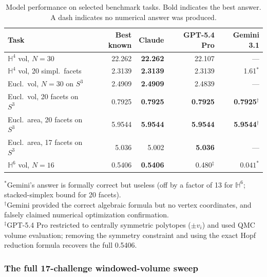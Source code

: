 \documentclass[11pt]{article}
\begin{document}
\begin{table}[ht]
\centering
\caption{Model performance on selected benchmark tasks.
Bold indicates the best answer. A dash indicates no numerical answer was produced.}
\label{tab:model-comparison}
\smallskip
\begin{tabular}{l r r r r}
\toprule
Task & Best known & Claude & GPT-5.4 Pro & Gemini 3.1 \\
\midrule
$\mathbb{H}^4$ vol, $N=30$ & 22.262 & \textbf{22.262} & 22.107 & --- \\
$\mathbb{H}^4$ vol, 20 simpl.\ facets & 2.3139 & \textbf{2.3139} & 2.3139 & 1.61$^*$ \\
Eucl.\ vol, $N=30$ on $S^3$ & 2.4909 & \textbf{2.4909} & 2.4839 & --- \\
Eucl.\ vol, 20 facets on $S^3$ & 0.7925 & \textbf{0.7925} & \textbf{0.7925} & \textbf{0.7925}$^\dagger$ \\
Eucl.\ area, 20 facets on $S^3$ & 5.9544 & \textbf{5.9544} & \textbf{5.9544} & \textbf{5.9544}$^\dagger$ \\
Eucl.\ area, 17 facets on $S^3$ & 5.036 & 5.002 & \textbf{5.036} & --- \\
$\mathbb{H}^6$ vol, $N=16$ & 0.5406 & \textbf{0.5406} & 0.480$^\ddagger$ & $0.041^{*}$ \\
\bottomrule
\end{tabular}
\smallskip

{\footnotesize $^*$Gemini's answer is formally correct but useless
(off by a factor of 13 for $\mathbb{H}^6$; stacked-simplex bound for 20 facets).\\
$^\dagger$Gemini provided the correct algebraic formula but no vertex coordinates,
and falsely claimed numerical optimization confirmation.\\
$^\ddagger$GPT-5.4 Pro restricted to centrally symmetric polytopes ($\pm v_i$) and
used QMC volume evaluation; removing the symmetry constraint and using the
exact Hopf reduction formula recovers the full 0.5406.}
\end{table}

\subsubsection{The full 17-challenge windowed-volume sweep}
\end{document}
